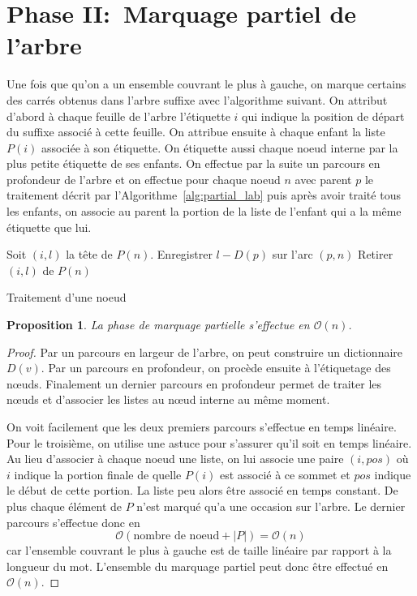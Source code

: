 \documentclass[10pt,letterpaper,oneside]{article}
\newtheorem{proposition}{Proposition}
\newcommand{\bigo}{\mathcal{O}}
\begin{document}
\section{Phase II:~Marquage partiel de l'arbre}

Une fois que qu'on a un ensemble couvrant le plus à gauche, on marque certains des carrés obtenus dans l'arbre suffixe avec l'algorithme suivant. On attribut d'abord à chaque feuille de l'arbre l'étiquette $i$ qui indique la position de départ du suffixe associé à cette feuille. On attribue ensuite à chaque enfant la liste $P(i)$ associée à son étiquette. On étiquette aussi chaque noeud interne par la plus petite étiquette de ses enfants. On effectue par la suite un parcours en profondeur de l'arbre et on effectue pour chaque noeud $n$ avec parent $p$ le traitement décrit par l'Algorithme~\ref{alg:partial_lab} puis après avoir traité tous les enfants, on associe au parent la portion de la liste de l'enfant qui a la même étiquette que lui.

\begin{algorithm}
    \begin{algorithmic}
            \State Soit $(i,l)$ la tête de $P(n)$.
            \State Enregistrer $l-D(p)$ sur l'arc $(p,n)$
            \State Retirer $(i,l)$ de $P(n)$
        \EndWhile
    \end{algorithmic}
    \caption{Traitement d'une noeud} \label{alg:partial_lab}
\end{algorithm}

\begin{proposition}
    La phase de marquage partielle s'effectue en $\bigo(n)$.
\end{proposition}
\begin{proof}
    Par un parcours en largeur de l'arbre, on peut construire un dictionnaire $D(v)$. Par un parcours en profondeur, on procède ensuite à l'étiquetage des nœuds. Finalement un dernier parcours en profondeur permet de traiter les nœuds et d'associer les listes au nœud interne au même moment.
    
    On voit facilement que les deux premiers parcours s'effectue en temps linéaire. Pour le troisième, on utilise une astuce pour s'assurer qu'il soit en temps linéaire. Au lieu d'associer à chaque noeud une liste, on lui associe une paire $(i,pos)$ où $i$ indique la portion finale de quelle $P(i)$ est associé à ce sommet et $pos$ indique le début de cette portion. La liste peu alors être associé en temps constant. De plus chaque élément de $P$ n'est marqué qu'a une occasion sur l'arbre. Le dernier parcours s'effectue donc en
    $$\bigo(\text{nombre de noeud}+|P|)=\bigo(n)$$
    car l'ensemble couvrant le plus à gauche est de taille linéaire par rapport à la longueur du mot.
    L'ensemble du marquage partiel peut donc être effectué en $\bigo(n)$.
\end{proof}
\end{document}
